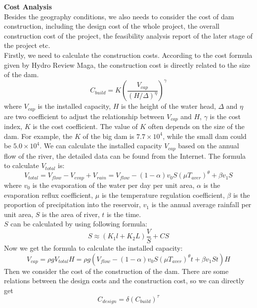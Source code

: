\documentclass{mcmthesis}
\begin{document}
\textbf{Cost Analysis}\\
\indent Besides the geography conditions, we also needs to consider the cost of dam construction, including the design cost of the whole project, the overall construction cost of the project, the feasibility analysis report of the later stage of the project etc.\\
Firstly, we need to calculate the construction costs. According to the cost formula given by Hydro Review Maga, the construction cost is directly related to the size of the dam.
\begin{equation}
C_{build} = K(\frac{V_{cap}}{(H/\Delta)^{\eta}})^{\gamma}
\end{equation}
where $V_{cap}$ is the installed capacity, $H$ is the height of the water head, $\Delta$ and $\eta$ are two  coefficient to adjust the relationship between $V_{cap}$ and $H$, $\gamma$ is the cost index, $K$ is the cost coefficient. The value of $K$ often depends on the size of the dam. For example, the $K$ of the big dam is $7.7\times10^4$, while the small dam could be $5.0 \times 10^4$.
\indent We can calculate the installed capacity $V_{cap}$ based on the annual flow of the river, the detailed data can be found from the Internet. The formula to calculate $V_{total}$ is:
\begin{equation}
V_{total} = V_{flow} - V_{evap} + V_{rain} = V_{flow} - (1-{\alpha})v_{0}S({\mu}T_{aver})^{\theta} + {\beta}v_{1}S
\end{equation}
where $v_{0}$ is the evaporation of the water per day per unit area, $\alpha$ is the evaporation reflux coefficient, $\mu$ is the temperature regulation coefficient, $\beta$ is the proportion of precipitation into the reservoir, $v_{1}$ is the annual average rainfall per unit area, $S$ is the area of river, $t$ is the time.\\
\indent $S$ can be calculated by using following formula:
\begin{equation}
S \approx \left(K_{1}l + K_{2}L\right)\frac{V}{S} + CS
\end{equation}
\indent Now we get the formula to calculate the installed capacity:
\begin{equation}
V_{cap} = {\rho}gV_{total}H = {\rho}g(V_{flow} - (1 - {\alpha})v_{0}S({\mu}T_{aver})^{\theta}t + {\beta}v_{1}St)H
\end{equation}
\indent Then we consider the cost of the construction of the dam. There are some relations between the design costs and the construction cost, so we can directly get
\begin{equation}
C_{design} = {\delta}(C_{build})^{\tau}
\end{equation}
\end{document}
